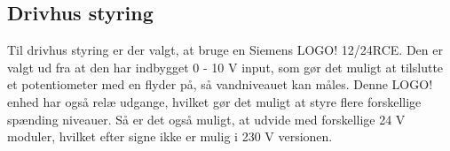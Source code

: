 \subsection{Drivhus styring}

Til drivhus styring er der valgt, at bruge en Siemens LOGO! 12/24RCE. 
Den er valgt ud fra at den har indbygget 0 - 10 V input, som gør det muligt at tilslutte et potentiometer med en flyder på, så vandniveauet kan måles.
Denne LOGO! enhed har også relæ udgange, hvilket gør det muligt at styre flere forskellige spænding niveauer.
Så er det også muligt, at udvide med forskellige 24 V moduler, hvilket efter signe ikke er mulig i 230 V versionen.
